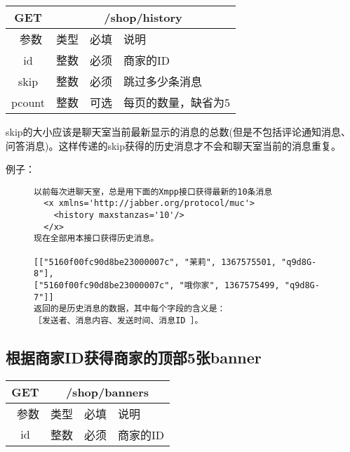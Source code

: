 \documentclass[cs4size]{ctexartutf8}
\begin{document}
\begin{table}[H]
   \begin{center}
\begin{tabular}{|c|c|c|p{12cm}|}
\hline
GET & \multicolumn{3}{|c|}{/shop/history} \\
\hline\hline
 \  参数  & 类型 & 必填 &  说明  \\
\hline
 id  & 整数 & 必须 & 商家的ID\\
   \hline
 skip  & 整数 & 必须 & 跳过多少条消息\\ 
 \hline
 pcount  & 整数 & 可选 & 每页的数量，缺省为5\\ 
\hline
\end{tabular}
   \end{center}
\end{table}

skip的大小应该是聊天室当前最新显示的消息的总数(但是不包括评论通知消息、问答消息)。这样传递的skip获得的历史消息才不会和聊天室当前的消息重复。

例子：

\begin{figure}[H]
\begin{verbatim}
以前每次进聊天室，总是用下面的Xmpp接口获得最新的10条消息
  <x xmlns='http://jabber.org/protocol/muc'>
    <history maxstanzas='10'/>
  </x>
现在全部用本接口获得历史消息。
  
[["5160f00fc90d8be23000007c", "茉莉", 1367575501, "q9d8G-8"], 
["5160f00fc90d8be23000007c", "哦你家", 1367575499, "q9d8G-7"]]
返回的是历史消息的数据，其中每个字段的含义是：
［发送者、消息内容、发送时间、消息ID ］。
\end{verbatim}
\end{figure}

\subsection{根据商家ID获得商家的顶部5张banner}

\begin{table}[H]
   \begin{center}
\begin{tabular}{|c|c|c|p{12cm}|}
\hline
GET & \multicolumn{3}{|c|}{/shop/banners} \\
\hline\hline
 \  参数  & 类型 & 必填 &  说明  \\
\hline
 id  & 整数 & 必须 & 商家的ID\\
\hline
\end{tabular}
   \end{center}
\end{table}
\end{document}
